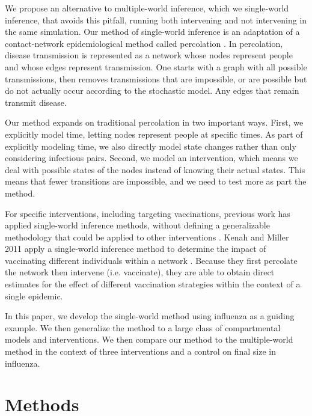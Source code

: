 \documentclass[openacc]{rsproca_new}%
\begin{document}
We propose an alternative to multiple-world inference, which we single-world inference, that avoids this pitfall, running both intervening and not intervening in the same simulation.
Our method of single-world inference is an adaptation of a contact-network epidemiological method called percolation \cite{miller-book}.
In percolation, disease transmission is represented as a network whose nodes represent people and whose edges represent transmission.
One starts with a graph with all possible transmissions, then removes transmissions that are impossible, or are possible but do not actually occur according to the stochastic model.
Any edges that remain transmit disease.

Our method expands on traditional percolation in two important ways.
First, we explicitly model time, letting nodes represent people at specific times.
As part of explicitly modeling time, we also directly model state changes rather than only considering infectious pairs.
Second, we model an intervention, which means we deal with possible states of the nodes instead of knowing their actual states.
This means that fewer transitions are impossible, and we need to test more as part the method.

For specific interventions, including targeting vaccinations, previous work has applied single-world inference methods, without defining a generalizable methodology that could be applied to other interventions \cite{kenah-miller:2011}.
Kenah and Miller 2011 apply a single-world inference method to determine the impact of vaccinating different individuals within a network \cite{kenah-miller:2011}.
Because they first percolate the network then intervene (i.e. vaccinate), they are able to obtain direct estimates for the effect of different vaccination strategies within the context of a single epidemic.

In this paper, we develop the single-world method using influenza as a guiding example.
We then generalize the method to a large class of compartmental models and interventions.
We then compare our method to the multiple-world method in the context of three interventions and a control on final size in influenza.

\section{Methods}
\end{document}

